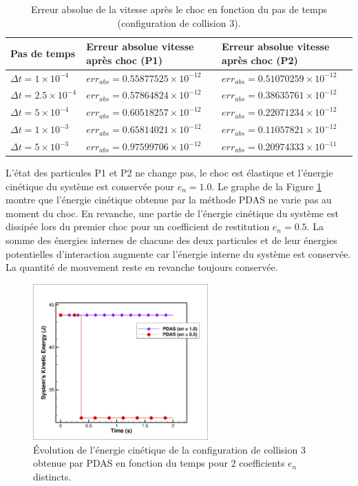  \begin{center}
 \begin{table}[!h]
\begin{tabular}{ |p{2.7cm}|p{4.9cm}|p{4.9cm}| }
 \hline \rowcolor{lightgray}
 Pas de temps & Erreur absolue vitesse après choc (P1) & Erreur absolue vitesse après choc (P2)\\
 \hline
 $\Delta t = 1\times10^{-4}$ & $err_{abs} = 0.55877525\times10^{-12}$ & $err_{abs} = 0.51070259\times10^{-12}$\\
 $\Delta t = 2.5\times10^{-4}$ & $err_{abs} = 0.57864824\times10^{-12}$ & $err_{abs} = 0.38635761\times10^{-12}$\\
 $\Delta t = 5\times10^{-4}$ & $err_{abs} = 0.60518257\times10^{-12}$ & $err_{abs} = 0.22071234\times10^{-12}$\\
 $\Delta t = 1\times10^{-3}$ & $err_{abs} = 0.65814021\times10^{-12}$ & $err_{abs} = 0.11057821\times10^{-12}$\\
 $\Delta t = 5\times10^{-3}$ & $err_{abs} = 0.97599706\times10^{-12}$ & $err_{abs} = 0.20974333\times10^{-11}$\\
 \hline
\end{tabular}
\caption{Erreur absolue de la vitesse après le choc en fonction du pas de temps (configuration de collision 3).}\label{tab6}
\end{table}
\end{center}
\vspace{-0.8cm}
L'état des particules P1 et P2 ne change pas, le choc est élastique et l'énergie cinétique du système est conservée pour $e_n = 1.0$. Le graphe de la Figure \ref{fig4} montre que l'énergie cinétique obtenue par la méthode PDAS ne varie pas au moment du choc. En revanche, une partie de l'énergie cinétique du système est dissipée lors du premier choc pour un coefficient de restitution $e_n = 0.5$. La somme des énergies internes de chacune des deux particules et de leur énergies potentielles d’interaction augmente car l’énergie interne du système est conservée. La quantité de mouvement reste en revanche toujours conservée.

\begin{figure}[!h]
  \centering
    \includegraphics[width=0.6\textwidth]{chapitres/chapitre_3/figures/ec_en.png}
    \caption{\centering Évolution de l'énergie cinétique de la configuration de collision 3 obtenue par PDAS en fonction du temps pour $2$ coefficients $e_n$ distincts.}\label{fig4}
\end{figure}

